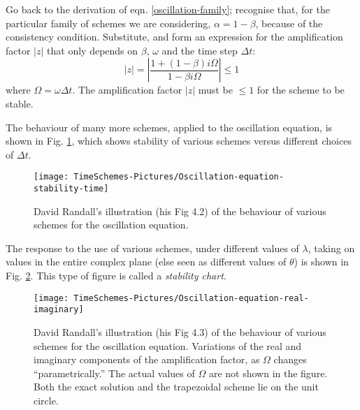 \begin{exercise}
	Go back to the derivation of eqn. \ref{oscillation-family}; recognise that, for the particular family of schemes we are considering, $\alpha=1-\beta$, because of the consistency condition. Substitute, and form an expression for the amplification factor $|z|$ that only depends on $\beta$, $\omega$ and the time step $\Delta t$:
	\begin{equation}
		|z| = \left| \frac {1+(1-\beta)i \Omega}{1-\beta i \Omega} \right| \le 1
	\end{equation}
	where $\Omega= \omega \Delta t$. The amplification factor $|z|$ must be $\le 1$ for the scheme to be stable.
\end{exercise}

\medskip

The behaviour of many more schemes, applied to the oscillation equation, is shown in Fig. \ref{fig:Oscillation-equation-stability-time}, which shows stability of various schemes versus different choices of $\Delta t$.

\begin{figure}[h!]
	\texttt{[image: TimeSchemes-Pictures/Oscillation-equation-stability-time]}
	\caption{David Randall's illustration (his Fig 4.2) of the behaviour of various schemes for the oscillation equation.}
	\label{fig:Oscillation-equation-stability-time}
\end{figure}

The response to the use of various schemes, under different values of $\lambda$, taking on values in the entire complex plane (else seen as different values of $\theta$) is shown in  Fig. \ref{fig:Oscillation-equation-real-imaginary}. This type of figure is called a \emph{stability chart}. 

\begin{figure}[h!]
	\texttt{[image: TimeSchemes-Pictures/Oscillation-equation-real-imaginary]}
	\caption{David Randall's illustration (his Fig 4.3) of the behaviour of various schemes for the oscillation equation. Variations of the real and imaginary components of the amplification factor, as $\Omega$ changes “parametrically.” The actual values of $\Omega$ are not shown in the figure. Both the exact solution and the trapezoidal scheme lie on the unit circle.}
	\label{fig:Oscillation-equation-real-imaginary}
\end{figure}


